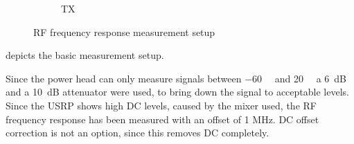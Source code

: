 \documentclass[12pt,a4paper,parskip=full]{scrartcl}
\begin{document}
\begin{figure}[htb]
\begin{subfigure}[t]{.5\linewidth}
{
        }
        \caption{TX}
    \end{subfigure}
    \caption{RF frequency response measurement setup}
    \label{fig:rfsetup}
\end{figure}
 depicts the basic measurement setup.

Since the power head can only measure signals between \SI{-60}{\deci\belm} and
\SI{20}{\deci\belm} a \SI{6}{\deci\bel} and a \SI{10}{\deci\bel} attenuator were used,
to bring down the signal to acceptable levels. Since the USRP shows high DC levels,
caused by the mixer used, the RF frequency response has been measured with an offset
of 1 MHz. DC offset correction is not an option, since this removes DC completely.
\end{document}
